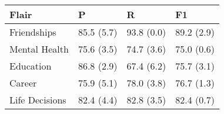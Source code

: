 \begin{tabular}{llll}
	\toprule
    \textbf{Flair} & \textbf{P} & \textbf{R} & \textbf{F1} \\
    \midrule
    Friendships & 85.5 (5.7) & 93.8 (0.0) & 89.2 (2.9) \\
    Mental Health & 75.6 (3.5) & 74.7 (3.6) & 75.0 (0.6) \\
    Education & 86.8 (2.9) & 67.4 (6.2) & 75.7 (3.1) \\
    Career & 75.9 (5.1) & 78.0 (3.8) & 76.7 (1.3)\\
    Life Decisions & 82.4 (4.4) & 82.8 (3.5) & 82.4 (0.7) \\
    \bottomrule
\end{tabular}